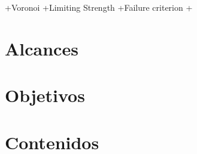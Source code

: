 +Voronoi
+Limiting Strength
+Failure criterion
+


\section{Alcances}
\label{S1_3}



\section{Objetivos}
\label{S1_4}


\section{Contenidos}
\label{S1_5}

